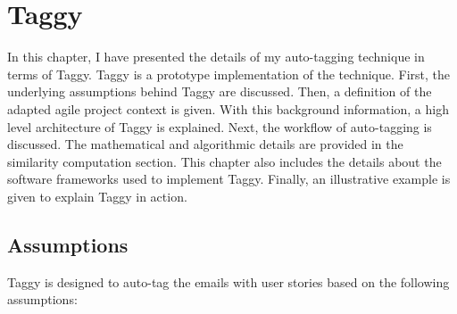 \fancyhead[RO,LE]{\thepage}
\fancyfoot{} 
\chapter{Taggy}
\label{ch:taggy}
In this chapter, I have presented the details of my auto-tagging technique in terms of Taggy. Taggy is a prototype implementation of the technique. First, the underlying assumptions behind Taggy are discussed. Then, a definition of the adapted agile project context is given. With this background information, a high level architecture of Taggy is explained. Next, the workflow of auto-tagging is discussed. The mathematical and algorithmic details are provided in the similarity computation section. This chapter also includes the details about the software frameworks used to implement Taggy. Finally, an illustrative example is given to explain Taggy in action.

\section{Assumptions}
Taggy is designed to auto-tag the emails with user stories based on the following assumptions:

